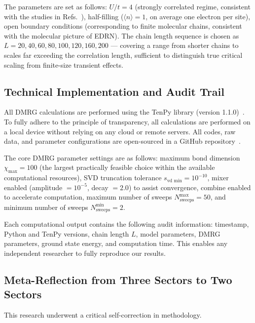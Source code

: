 \documentclass[prb,reprint,twocolumn,superscriptaddress]{revtex4-2}
\begin{document}
The parameters are set as follows: $U/t = 4$ (strongly correlated regime, consistent with the studies in Refs.~\cite{Luo2023,Luo2024}), half-filling ($\langle n \rangle = 1$, on average one electron per site), open boundary conditions (corresponding to finite molecular chains, consistent with the molecular picture of EDRN). The chain length sequence is chosen as $L = 20, 40, 60, 80, 100, 120, 160, 200$ --- covering a range from shorter chains to scales far exceeding the correlation length, sufficient to distinguish true critical scaling from finite-size transient effects.

\subsection{Technical Implementation and Audit Trail}

All DMRG calculations are performed using the TenPy library (version 1.1.0)~\cite{Hauschild2018}. To fully adhere to the principle of transparency, all calculations are performed on a local device without relying on any cloud or remote servers. All codes, raw data, and parameter configurations are open-sourced in a GitHub repository~\cite{Li2026GitHub}.

The core DMRG parameter settings are as follows: maximum bond dimension $\chi_{\max} = 100$ (the largest practically feasible choice within the available computational resources), SVD truncation tolerance $s_{\text{vd min}} = 10^{-10}$, mixer enabled (amplitude $= 10^{-5}$, decay $= 2.0$) to assist convergence, combine enabled to accelerate computation, maximum number of sweeps $N_{\text{sweeps}}^{\max} = 50$, and minimum number of sweeps $N_{\text{sweeps}}^{\min} = 2$.

Each computational output contains the following audit information: timestamp, Python and TenPy versions, chain length $L$, model parameters, DMRG parameters, ground state energy, and computation time. This enables any independent researcher to fully reproduce our results.

\subsection{Meta-Reflection from Three Sectors to Two Sectors}

This research underwent a critical self-correction in methodology.
\end{document}
